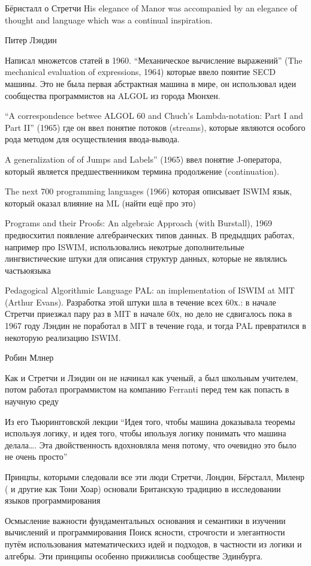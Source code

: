 \documentclass[14pt]{matmex-diploma-custom}
\begin{document}
Бёрнсталл о Стретчи
His elegance of Manor was accompanied by an elegance of thought and language which was a continual inspiration.


Питер Лэндин

Написал множетсов статей в 1960.
“Механическое вычисление выражений” (The mechanical evaluation of expressions, 1964) которые ввело поянтие SECD машины. Это не была  первая абстрактная машина в мире, он использовал идеи сообщества программистов на ALGOL из города Мюнхен. 

“A correspondence betwee ALGOL 60 and Chuch’s Lambda-notation: Part I and Part II” (1965) где он ввел понятие потоков (streams), которые являются особого рода методом для осуществления ввода-вывода.

A generalization of of Jumps and Labels” (1965) ввел понятие J-оператора, который является предшественником термина продолжение (continuation).

The next 700 programming languages (1966) которая описывает ISWIM язык, который оказал влияние на ML (найти ещё про это)

Programs and their Proofs: An algebraic Approach (with Burstall), 1969 предвосхитил появление алгебраических типов данных. В предыдщих работах, например про ISWIM, использовались некотрые дополнительные лингвистические  штуки для описания структур данных, которые не являлись частьюязыка 

Pedagogical Algorithmic Language 
PAL: an implementation of ISWIM at MIT (Arthur Evans). Разработка этой штуки шла  в течение всех 60х.: в начале Стретчи приезжал пару раз в MIT в начале 60х, но дело не сдвигалось пока в 1967 году Лэндин не поработал в MIT в течение года, и тогда PAL превратился в некоторую реализацию ISWIM. 

Робин Млнер

Как и Стретчи и Лэндин он не начинал как ученый, а был школьным учителем, потом работал программистом на компанию Ferranti перед тем как попасть в научную среду 

Из его Тьюрингговской лекции
“Идея того, чтобы машина доказывала теоремы используя логику, и идея того, чтобы ипользуя логику понимать что машина делала…. Эта двойственность  вдохновляла меня потому, что очевидно это было не очень просто”

Принцпы, которыми следовали все эти люди
Стретчи, Лондин, Бёрсталл, Миленр ( и другие как Тони Хоар) основали Британскую традицию  в исследовании языков программирования

Осмысление важности фундаментальных основания и семантики в изучении вычислений и программирования
Поиск ясности, строчгости и элегантности путём использования математическихз идей и подходов, в частности из логики и алгебры.
Эти принципы особенно прижилисьв сообществе Эдинбурга.
 
\end{document}
